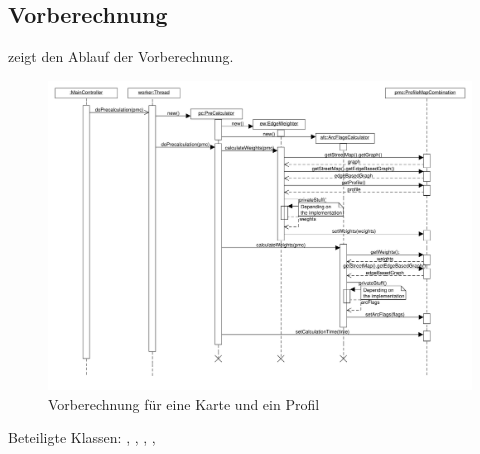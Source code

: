 \documentclass[a4paper, 11pt]{article}
\begin{document}
\subsection{Vorberechnung}
 zeigt den Ablauf der Vorberechnung.
\begin{figure}[H]
\centering
\includegraphics[angle=90, height=0.8\textheight]{PreCalculationSequenz}
\caption{Vorberechnung für eine Karte und ein Profil}
\label{fig:sequenz_vorberechnung}
\end{figure}
Beteiligte Klassen: , , , , 


\makeatletter
{}
\makeatother
\printglossary[type=main, title={Glossar}, toctitle={Glossar}, style=myAltlist]
\end{document}
